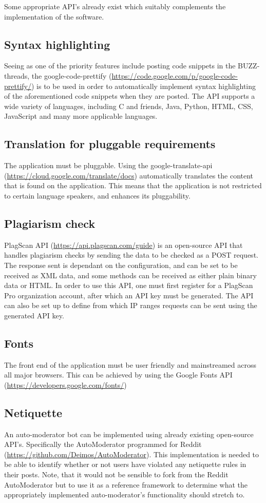 

\begin{flushleft}
	Some appropriate API's already exist which suitably complements the implementation of the software.
	
	\subsection{Syntax highlighting}
	Seeing as one of the priority features include posting code snippets in the BUZZ-threads, the google-code-prettify (\url{https://code.google.com/p/google-code-prettify/}) is to be used in order to automatically implement syntax highlighting of the aforementioned code snippets when they are posted. The API supports a wide variety of languages, including C and friends, Java, Python, HTML, CSS, JavaScript and many more applicable languages.
	\subsection{Translation for pluggable requirements}
	The application must be pluggable. Using the google-translate-api (\url{https://cloud.google.com/translate/docs}) 
	automatically translates the content that is found on the application. This means that the application is not restricted to certain language speakers, and enhances its pluggability.
	\subsection{Plagiarism check}
	PlagScan API (\url{https://api.plagscan.com/guide}) is an open-source API that handles plagiarism checks by sending the data to be checked as a POST request. The response sent is dependant on the configuration, and can be set to be received as XML data, and some methods can be received as either plain binary data or HTML. In order to use this API, one must first register for a PlagScan Pro organization account, after which an API key must be generated. The API can also be set up to define from which IP ranges requests can be sent using the generated API key.
	\subsection{Fonts}
	The front end of the application must be user friendly and mainstreamed across all major browsers. This can be achieved by using the Google Fonts API (\url{https://developers.google.com/fonts/})
	\subsection{Netiquette}
	An auto-moderator bot can be implemented using already existing open-source API's. Specifically the AutoModerator programmed for Reddit (\url{https://github.com/Deimos/AutoModerator}). This implementation is needed to be able to identify whether or not users have violated any netiquette rules in their posts. Note, that it would not be sensible to fork from the Reddit AutoModerator but to use it as a reference framework to determine what the appropriately implemented auto-moderator's functionality should stretch to.

\end{flushleft}